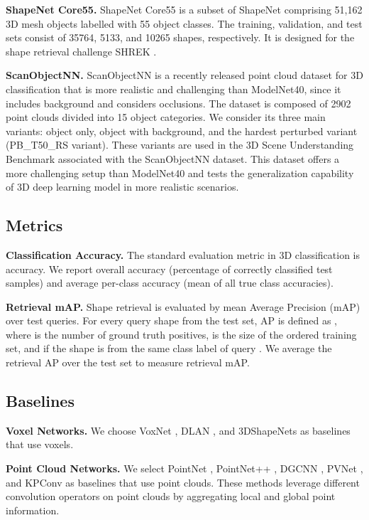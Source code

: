 \documentclass[10pt,twocolumn,letterpaper]{article}
\newcommand{\mysection}[1]{\noindent\textbf{#1.}}
\begin{document}
\mysection{ShapeNet Core55}
ShapeNet Core55 is a subset of ShapeNet \cite{shapenet} comprising 51,162 3D mesh objects labelled with 55 object classes. The training, validation, and test sets consist of 35764, 5133, and 10265 shapes, respectively. It is designed for the shape retrieval challenge SHREK \cite{shrek17}. 

\mysection{ScanObjectNN}
ScanObjectNN \cite{scanobjectnn} is a recently released point cloud dataset for 3D classification that is more realistic and challenging than ModelNet40, since it includes background and considers occlusions. The dataset is composed of 2902 point clouds divided into 15 object categories. We consider its three main variants: object only, object with background, and the hardest perturbed variant (PB\_T50\_RS variant). These variants are used in the 3D Scene Understanding Benchmark associated with the ScanObjectNN dataset.
This dataset offers a more challenging setup than ModelNet40 and tests the generalization capability of 3D deep learning model in more realistic scenarios.

\subsection{Metrics}
\vspace{-4pt}
\mysection{Classification Accuracy} 
The standard evaluation metric in 3D classification is accuracy. We report overall accuracy (percentage of correctly classified test samples) and average per-class accuracy (mean of all true class accuracies).

\mysection{Retrieval mAP} 
Shape retrieval is evaluated by mean Average Precision (mAP) over test queries. For every query shape  from the test set, AP is defined as , where  is the number of ground truth positives,  is the size of the ordered training set, and  if the shape  is from the same class label of query . We average the retrieval AP over the test set to measure retrieval mAP.

\subsection{Baselines}
\vspace{-4pt}
\mysection{Voxel Networks}
We choose VoxNet \cite{voxnet}, DLAN \cite{dlanretr}, and 3DShapeNets \cite{modelnet} as baselines that use voxels.

\mysection{Point Cloud Networks}
We select PointNet \cite{pointnet}, PointNet++ \cite{pointnet++}, DGCNN \cite{dgcn}, PVNet \cite{pvnet}, and KPConv \cite{kpconv} as baselines that use point clouds.
These methods leverage different convolution operators on point clouds by aggregating local and global point information.
\end{document}
